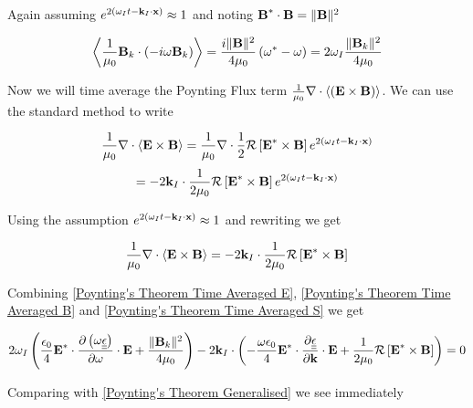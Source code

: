 Again assuming $e^{2 \left( \omega_I t - \textbf{k}_I \cdot \textbf{x} \right)} \approx 1$ and noting $\textbf{B}^* \cdot \textbf{B} = \|\textbf{B}\|^2$

\begin{equation} \label{Poynting's Theorem Time Averaged B}
	\left \langle \frac{1}{\mu_0} \textbf{B}_k \cdot \left( -i \omega \textbf{B}_k \right) \right \rangle = \frac{i \|\textbf{B}\|^2}{4 \mu_0} \left( \omega^* - \omega \right) = 2 \omega_I \frac{\|\textbf{B}_k\|^2}{4 \mu_0}
\end{equation}

Now we will time average the Poynting Flux term $\frac{1}{\mu_0} \nabla \cdot \left \langle \left( \textbf{E} \times \textbf{B} \right) \right \rangle$. We can use the standard method to write

\begin{equation*}
	\frac{1}{\mu_0} \nabla \cdot \left \langle \textbf{E} \times \textbf{B}  \right \rangle = \frac{1}{\mu_0} \nabla \cdot \frac{1}{2} \mathcal{R} \left[ \textbf{E}^* \times \textbf{B} \right] e^{2 \left( \omega_I t - \textbf{k}_I \cdot \textbf{x} \right)}
\end{equation*}
\begin{equation}
	= -2 \textbf{k}_I \cdot \frac{1}{2 \mu_0} \mathcal{R} \left[ \textbf{E}^* \times \textbf{B} \right] e^{2 \left( \omega_I t - \textbf{k}_I \cdot \textbf{x} \right)}
\end{equation}

Using the assumption $e^{2 \left( \omega_I t - \textbf{k}_I \cdot \textbf{x} \right)} \approx 1$ and rewriting we get

\begin{equation} \label{Poynting's Theorem Time Averaged S}
	\frac{1}{\mu_0} \nabla \cdot \left \langle \textbf{E} \times \textbf{B}  \right \rangle = -2 \textbf{k}_I \cdot \frac{1}{2 \mu_0} \mathcal{R} \left[ \textbf{E}^* \times \textbf{B} \right]
\end{equation}

Combining \eqref{Poynting's Theorem Time Averaged E}, \eqref{Poynting's Theorem Time Averaged B} and \eqref{Poynting's Theorem Time Averaged S} we get

\begin{equation}
	2 \omega_I \left( \frac{\epsilon_0}{4} \textbf{E}^* \cdot \frac{\partial \left( \omega \underline{\underline{\epsilon}} \right)}{\partial \omega} \cdot \textbf{E} + \frac{\|\textbf{B}_k\|^2}{4 \mu_0} \right) - 2 \textbf{k}_I \cdot \left( - \frac{\omega \epsilon_0}{4} \textbf{E}^* \cdot \frac{\partial \underline{\underline{\epsilon}}}{\partial \textbf{k}} \cdot \textbf{E} + \frac{1}{2 \mu_0} \mathcal{R} \left[ \textbf{E}^* \times \textbf{B} \right] \right) = 0
\end{equation}

Comparing with \eqref{Poynting's Theorem Generalised} we see immediately

